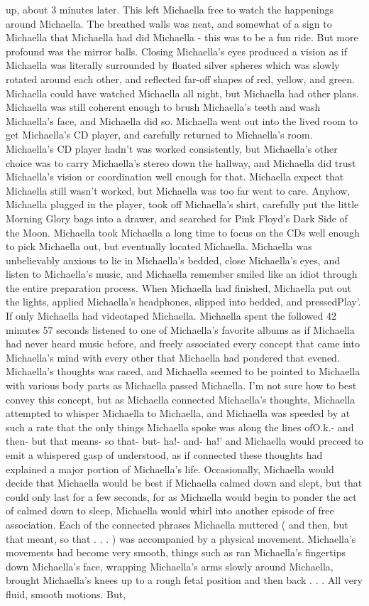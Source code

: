\documentclass[12pt]{book}
\begin{document}
up, about 3 minutes later. This left Michaella free to watch the happenings around Michaella. The breathed walls was neat, and somewhat of a sign to Michaella that Michaella had did Michaella - this was to be a fun ride. But more profound was the mirror balls. Closing Michaella's eyes produced a vision as if Michaella was literally surrounded by floated silver spheres which was slowly rotated around each other, and reflected far-off shapes of red, yellow, and green. Michaella could have watched Michaella all night, but Michaella had other plans. Michaella was still coherent enough to brush Michaella's teeth and wash Michaella's face, and Michaella did so. Michaella went out into the lived room to get Michaella's CD player, and carefully returned to Michaella's room. Michaella's CD player hadn't was worked consistently, but Michaella's other choice was to carry Michaella's stereo down the hallway, and Michaella did trust Michaella's vision or coordination well enough for that. Michaella expect that Michaella still wasn't worked, but Michaella was too far went to care. Anyhow, Michaella plugged in the player, took off Michaella's shirt, carefully put the little Morning Glory bags into a drawer, and searched for Pink Floyd's Dark Side of the Moon. Michaella took Michaella a long time to focus on the CDs well enough to pick Michaella out, but eventually located Michaella. Michaella was unbelievably anxious to lie in Michaella's bedded, close Michaella's eyes, and listen to Michaella's music, and Michaella remember smiled like an idiot through the entire preparation process. When Michaella had finished, Michaella put out the lights, applied Michaella's headphones, slipped into bedded, and pressedPlay'. If only Michaella had videotaped Michaella. Michaella spent the followed 42 minutes 57 seconds listened to one of Michaella's favorite albums as if Michaella had never heard music before, and freely associated every concept that came into Michaella's mind with every other that Michaella had pondered that evened. Michaella's thoughts was raced, and Michaella seemed to be pointed to Michaella with various body parts as Michaella passed Michaella. I'm not sure how to best convey this concept, but as Michaella connected Michaella's thoughts, Michaella attempted to whisper Michaella to Michaella, and Michaella was speeded by at such a rate that the only things Michaella spoke was along the lines ofO.k.- and then- but that means- so that- but- ha!- and- ha!' and Michaella would preceed to emit a whispered gasp of understood, as if connected these thoughts had explained a major portion of Michaella's life. Occasionally, Michaella would decide that Michaella would be best if Michaella calmed down and slept, but that could only last for a few seconds, for as Michaella would begin to ponder the act of calmed down to sleep, Michaella would whirl into another episode of free association. Each of the connected phrases Michaella muttered ( and then, but that meant, so that . . .   ) was accompanied by a physical movement. Michaella's movements had become very smooth, things such as ran Michaella's fingertips down Michaella's face, wrapping Michaella's arms slowly around Michaella, brought Michaella's knees up to a rough fetal position and then back . . .  All very fluid, smooth motions. But, 
\end{document}
